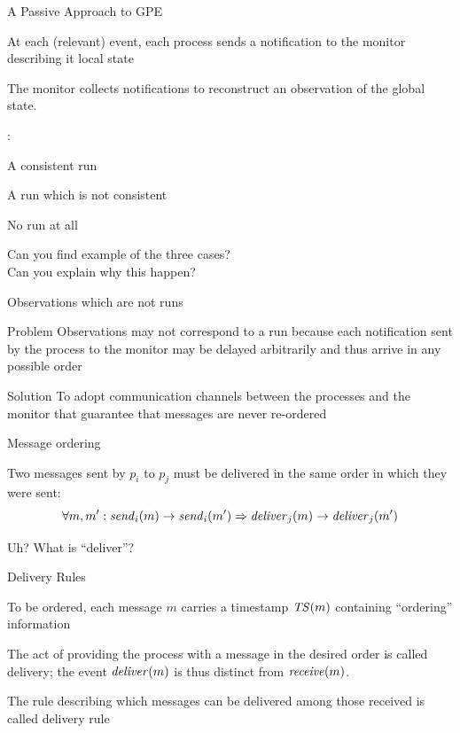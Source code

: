 \begin{frame}{A Passive Approach to GPE}

\BI
\item At each (relevant) event, each process sends a \alert{notification} to the 
  monitor describing it local state
\item The monitor collects \alert{notifications} to reconstruct an observation of the global state.
\EI

\bigskip
{}:
\BI
\item A consistent run
\item A run which is not consistent
\item No run at all
\EI

\bigskip
Can you find example of the three cases?\\
Can you explain why this happen?
\end{frame}


\begin{frame}{Observations which are not runs}

\begin{block}{Problem} 
Observations may not correspond to a run because each \alert{notification} sent
by the process to the monitor may be delayed arbitrarily and thus 
arrive in any possible order
\end{block}

\pause
\bigskip
\begin{block}{Solution}
To adopt communication channels between the processes and the monitor that 
guarantee that messages are never re-ordered
\end{block}

\end{frame}

\begin{frame}{Message ordering}
\begin{definition}
Two messages sent by $p_i$ to $p_j$ must be delivered in the
same order in which they were sent:
\[
\forall m,m': \mathit{send}_i(m) \rightarrow \mathit{send}_i(m') \Rightarrow \mathit{deliver}_j(m) \rightarrow \mathit{deliver}_j(m')
\]
\end{definition}

\bigskip
Uh? What is ``deliver''?

\end{frame}

\begin{frame}{Delivery Rules}

\BI
\item To be ordered, each message $m$ carries a \alert{timestamp} $\mathit{TS}(m)$ 
  containing ``ordering'' information
\item The act of providing the process with a message in the desired order
  is called \alert{delivery}; the event $\mathit{deliver}(m)$ is thus distinct from
  $\mathit{receive}(m)$.
\item The rule describing which messages can be delivered among those 
  received is called \alert{delivery rule}
\EI

\end{frame}


